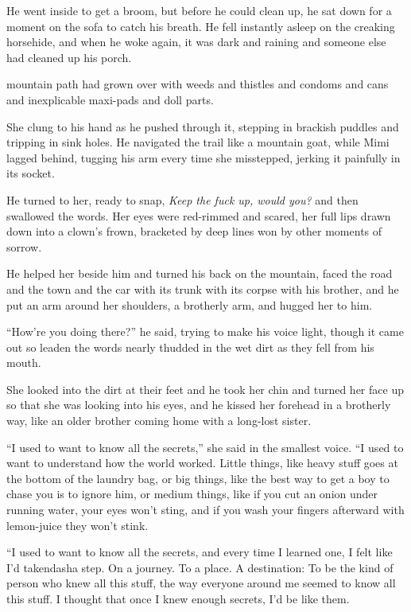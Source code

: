 He went inside to get a broom, but before he could clean up, he sat
down for a moment on the sofa to catch his breath.  He fell instantly
asleep on the creaking horsehide, and when he woke again, it was dark
and raining and someone else had cleaned up his porch.

 mountain path had grown over with weeds and thistles and condoms
and cans and inexplicable maxi-pads and doll parts.

She clung to his hand as he pushed through it, stepping in brackish
puddles and tripping in sink holes.  He navigated the trail like a
mountain goat, while Mimi lagged behind, tugging his arm every time
she misstepped, jerking it painfully in its socket.

He turned to her, ready to snap, \textit{Keep the fuck up, would you?}
and then swallowed the words.  Her eyes were red-rimmed and scared,
her full lips drawn down into a clown's frown, bracketed by deep lines
won by other moments of sorrow.

He helped her beside him and turned his back on the mountain, faced
the road and the town and the car with its trunk with its corpse with
his brother, and he put an arm around her shoulders, a brotherly arm,
and hugged her to him.

``How're you doing there?'' he said, trying to make his voice light,
though it came out so leaden the words nearly thudded in the wet dirt
as they fell from his mouth.

She looked into the dirt at their feet and he took her chin and turned
her face up so that she was looking into his eyes, and he kissed her
forehead in a brotherly way, like an older brother coming home with a
long-lost sister.

``I used to want to know all the secrets,'' she said in the smallest
voice.  ``I used to want to understand how the world worked.  Little
things, like heavy stuff goes at the bottom of the laundry bag, or big
things, like the best way to get a boy to chase you is to ignore him,
or medium things, like if you cut an onion under running water, your
eyes won't sting, and if you wash your fingers afterward with
lemon-juice they won't stink.

``I used to want to know all the secrets, and every time I learned
one, I felt like I'd takendash{}a step.  On a journey.  To a place.  A
destination:  To be the kind of person who knew all this stuff, the
way everyone around me seemed to know all this stuff.  I thought that
once I knew enough secrets, I'd be like them.

